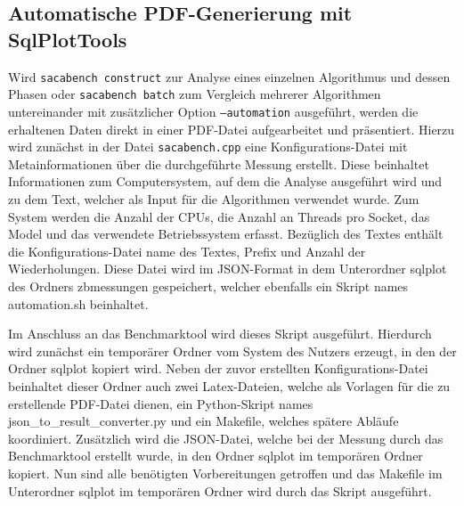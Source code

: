 \subsection{Automatische PDF-Generierung mit SqlPlotTools}
\label{framework:bechmark:sqlplottools}

Wird \texttt{sacabench construct} zur Analyse eines einzelnen Algorithmus und dessen Phasen oder \texttt{sacabench batch} zum Vergleich mehrerer Algorithmen untereinander mit zusätzlicher Option \texttt{--automation} ausgeführt, werden die erhaltenen Daten direkt in einer PDF-Datei aufgearbeitet und präsentiert.
Hierzu wird zunächst in der Datei \texttt{sacabench.cpp} eine Konfigurations-Datei mit Metainformationen über die durchgeführte Messung erstellt.
Diese beinhaltet Informationen zum Computersystem, auf dem die Analyse ausgeführt wird und zu dem Text, welcher als Input für die Algorithmen verwendet wurde.
Zum System werden die Anzahl der CPUs, die Anzahl an Threads pro Socket, das Model und das verwendete Betriebssystem erfasst.
Bezüglich des Textes enthält die Konfigurations-Datei name des Textes, Prefix und Anzahl der Wiederholungen.
Diese Datei wird im JSON-Format in dem Unterordner sqlplot des Ordners zbmessungen gespeichert, welcher ebenfalls ein Skript names automation.sh beinhaltet.

Im Anschluss an das Benchmarktool wird dieses Skript ausgeführt.
Hierdurch wird zunächst ein temporärer Ordner vom System des Nutzers erzeugt, in den der Ordner sqlplot kopiert wird.
Neben der zuvor erstellten Konfigurations-Datei beinhaltet dieser Ordner auch zwei Latex-Dateien, welche als Vorlagen für die zu erstellende PDF-Datei dienen, ein Python-Skript names \\
json\_to\_result\_converter.py und ein Makefile, welches spätere Abläufe koordiniert.
Zusätzlich wird die JSON-Datei, welche bei der Messung durch das Benchmarktool erstellt wurde, in den Ordner sqlplot im temporären Ordner kopiert.
Nun sind alle benötigten Vorbereitungen getroffen und das Makefile im Unterordner sqlplot im temporären Ordner wird durch das Skript ausgeführt.

